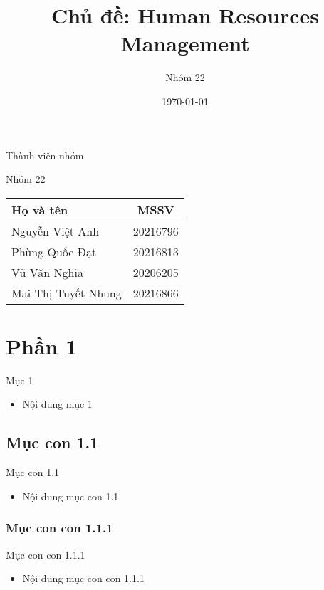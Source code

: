 \documentclass{beamer}
\title[{\makebox[.15\paperwidth]{Human Resources Management}}]{Chủ đề: Human Resources Management}
\author[Nhóm 22]{Nhóm 22}
\date[Data Warehouse \& BI]{\today}
\begin{document}
\begin{frame}
\titlepage
\end{frame}
\begin{frame}{Thành viên nhóm}
\begin{block}{Nhóm 22}
\centering
\begin{tabular} {|l|c|}
\hline
Họ và tên & MSSV \\
\hline
Nguyễn Việt Anh & 20216796 \\
Phùng Quốc Đạt & 20216813 \\
Vũ Văn Nghĩa & 20206205 \\
Mai Thị Tuyết Nhung & 20216866 \\
\hline
\end{tabular}
\end{block}
\end{frame}

\section{Phần 1}
\begin{frame}{Mục 1}
\begin{itemize}
\item Nội dung mục 1
\end{itemize}
\end{frame}

\subsection{Mục con 1.1}
\begin{frame}{Mục con 1.1}
\begin{itemize}
\item Nội dung mục con 1.1
\end{itemize}
\end{frame}

\subsubsection{Mục con con 1.1.1}
\begin{frame}{Mục con con 1.1.1}
\begin{itemize}
\item Nội dung mục con con 1.1.1
\end{itemize}
\end{frame}
\end{document}
